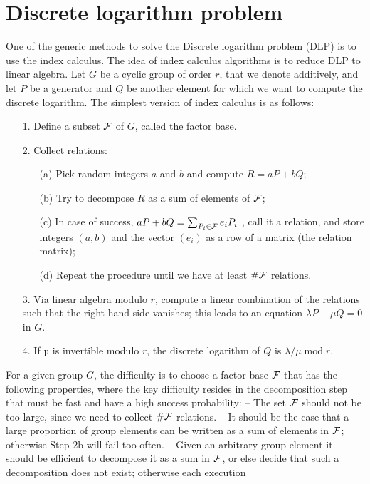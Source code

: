 \documentclass[12pt, letterpaper]{report}
\begin{document}
\section{Discrete logarithm problem}
One of the generic methods to solve the Discrete logarithm problem (DLP) is to use the index calculus.
The idea of index calculus algorithms is to reduce DLP to
linear algebra. Let $G$ be a cyclic group of order $r$, that we denote additively, and let $P$ be a generator and $Q$ be another element
for which we want to compute the discrete logarithm. The simplest version of index
calculus is as follows:
\begin{enumerate}
\item[1.] Define a subset ${\cal F}$ of $G$, called the factor base.
\item[2.] Collect relations:
\begin{enumerate}[align=left]
\item[(a)] Pick random integers $a$ and $b$ and compute $R = aP + bQ$;
\item[(b)] Try to decompose $R$ as a sum of elements of ${\cal F}$;
\item[(c)] In case of success, $aP + bQ = \sum_{P_{i}\in {\cal F}}e_{i}P_{i}$
, call it a relation, and store integers
$(a, b)$ and the vector $(e_{i})$ as a row of a matrix (the relation matrix);
\item[(d)] Repeat the procedure until we have at least $\#{\cal F}$ relations.
\end{enumerate}
\item[3.] Via linear algebra modulo $r$, compute a linear combination of the relations such
that the right-hand-side vanishes; this leads to an equation $\lambda P + \mu Q = 0$ in $G$.
\item[4.] If $µ$ is invertible modulo $r$, the discrete logarithm of $Q$ is $\lambda/\mu \mathop{\mathrm{mod}} r$.
\end{enumerate}
For a given group $G$, the difficulty is to choose a factor base ${\cal F}$ that has the following
properties, where the key difficulty resides in the decomposition step that must be fast
and have a high success probability:
– The set ${\cal F}$ should not be too large, since we need to collect $\#{\cal F}$ relations.
– It should be the case that a large proportion of group elements can be written as
a sum of elements in ${\cal F}$; otherwise Step 2b will fail too often.
– Given an arbitrary group element it should be efficient to decompose it as a sum in
${\cal F}$, or else decide that such a decomposition does not exist; otherwise each execution
\end{document}

